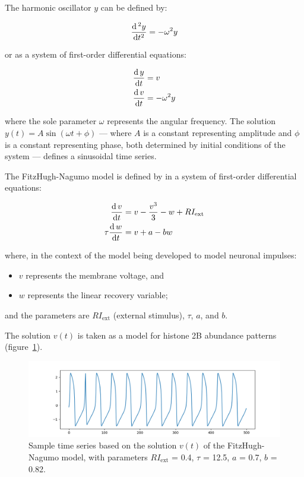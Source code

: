 The harmonic oscillator $y$ can be defined by:

\begin{equation}
  \frac{\mathrm{d} \,^{2} y}{\mathrm{d} t^{2}} = -\omega^{2}y
  \label{eq:harmonic}
\end{equation}

or as a system of first-order differential equations:

\begin{equation}
  \begin{aligned}
    \frac{\mathrm{d} \, y}{\mathrm{d} t} &= v \\
    \frac{\mathrm{d} \, v}{\mathrm{d} t} &= -\omega^{2}y
  \end{aligned}
  \label{eq:harmonic-1o}
\end{equation}

where the sole parameter $\omega$ represents the angular frequency.
The solution $y(t) = A \sin(\omega{}t + \phi)$ --- where $A$ is a constant representing amplitude and $\phi$ is a constant representing phase, both determined by initial conditions of the system --- defines a sinusoidal time series.

The FitzHugh-Nagumo model is defined by in a system of first-order differential equations:

\begin{equation}
  \begin{aligned}
    \frac{\mathrm{d} \, v}{\mathrm{d} t} &= v - \frac{v^3}{3} - w + RI_{\mathrm{ext}} \\
    \tau \frac{\mathrm{d} \, w}{\mathrm{d} t} &= v + a - bw
  \end{aligned}
  \label{eq:fhn}
\end{equation}

where, in the context of the model being developed to model neuronal impulses:
\begin{itemize}
  \item $v$ represents the membrane voltage, and
  \item $w$ represents the linear recovery variable;
\end{itemize}

and the parameters are $RI_{\mathrm{ext}}$ (external stimulus), $\tau$, $a$, and $b$.

The solution $v(t)$ is taken as a model for histone 2B abundance patterns (figure~\ref{fig:fitzhughnagumo_sample}).

\begin{figure}
  \centering
  \includegraphics[width=0.9\linewidth]{fitzhughnagumo_sample.png}
  \caption{
    Sample time series based on the solution $v(t)$ of the FitzHugh-Nagumo model, with parameters
    $RI_{\mathrm{ext}}$ = 0.4, $\tau$ = 12.5, $a$ = 0.7, $b$ = 0.82.
  }
  \label{fig:fitzhughnagumo_sample}
\end{figure}

